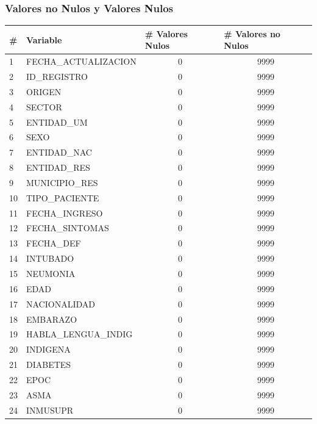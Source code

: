 \subsubsection{Valores no Nulos y Valores Nulos}
\begin{table}[h]
\resizebox{10cm}{!} {
\begin{tabular}{|l|l|c|c|}
\hline
\# & Variable & \multicolumn{1}{l|}{\# Valores Nulos} & \multicolumn{1}{l|}{\# Valores no Nulos} \\ \hline
1  & FECHA\_ACTUALIZACION    & 0 & 9999 \\ \hline
2  & ID\_REGISTRO            & 0 & 9999 \\ \hline
3  & ORIGEN                  & 0 & 9999 \\ \hline
4  & SECTOR                  & 0 & 9999 \\ \hline
5  & ENTIDAD\_UM             & 0 & 9999 \\ \hline
6  & SEXO                    & 0 & 9999 \\ \hline
7  & ENTIDAD\_NAC            & 0 & 9999 \\ \hline
8  & ENTIDAD\_RES            & 0 & 9999 \\ \hline
9  & MUNICIPIO\_RES          & 0 & 9999 \\ \hline
10 & TIPO\_PACIENTE          & 0 & 9999 \\ \hline
11 & FECHA\_INGRESO          & 0 & 9999 \\ \hline
12 & FECHA\_SINTOMAS         & 0 & 9999 \\ \hline
13 & FECHA\_DEF              & 0 & 9999 \\ \hline
14 & INTUBADO                & 0 & 9999 \\ \hline
15 & NEUMONIA                & 0 & 9999 \\ \hline
16 & EDAD                    & 0 & 9999 \\ \hline
17 & NACIONALIDAD            & 0 & 9999 \\ \hline
18 & EMBARAZO                & 0 & 9999 \\ \hline
19 & HABLA\_LENGUA\_INDIG    & 0 & 9999 \\ \hline
20 & INDIGENA                & 0 & 9999 \\ \hline
21 & DIABETES                & 0 & 9999 \\ \hline
22 & EPOC                    & 0 & 9999 \\ \hline
23 & ASMA                    & 0 & 9999 \\ \hline
24 & INMUSUPR                & 0 & 9999 \\ \hline

\end{tabular}}
\end{table}
